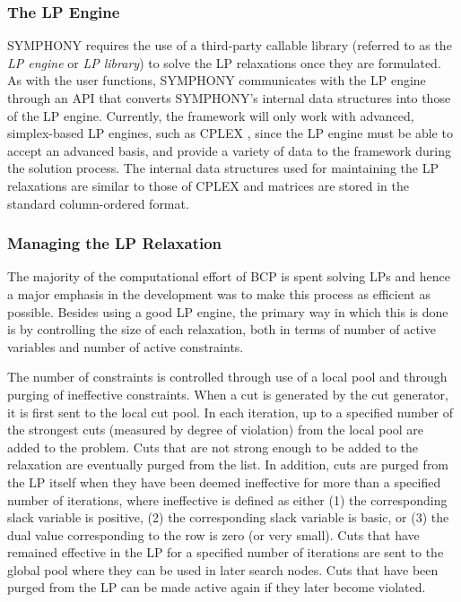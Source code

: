 \subsubsection{The LP Engine}

SYMPHONY requires the use of a third-party callable library (referred
to as the {\em LP engine} or {\em LP library}) to solve the LP
relaxations once they are formulated. As with the user functions,
SYMPHONY communicates with the LP engine through an API that converts
SYMPHONY's internal data structures into those of the LP engine.
Currently, the framework will only work with advanced, simplex-based
LP engines, such as CPLEX \cite{cplex}, since the LP engine must be
able to accept an advanced basis, and provide a variety of data to the
framework during the solution process. The internal data structures
used for maintaining the LP relaxations are similar to those of CPLEX
and matrices are stored in the standard column-ordered format.

\subsubsection{Managing the LP Relaxation}
\label{lp-relaxation}

The majority of the computational effort of BCP is spent
solving LPs and hence a major emphasis in the development was to make
this process as efficient as possible. Besides using a good LP engine,
the primary way in which this is done is by controlling the size of
each relaxation, both in terms of number of active variables and
number of active constraints. 

The number of constraints is controlled through use of a local
pool and through purging of ineffective constraints. When a cut is
generated by the cut generator, it is first sent to the local cut
pool. In each iteration, up to a specified number of the strongest
cuts (measured by degree of violation) from the local pool are added
to the problem. Cuts that are not strong enough to be added to the
relaxation are eventually purged from the list. In addition, cuts are
purged from the LP itself when they have been deemed ineffective for
more than a specified number of iterations, where ineffective is
defined as either (1) the corresponding slack variable is positive,
(2) the corresponding slack variable is basic, or (3) the dual value
corresponding to the row is zero (or very small). Cuts that have
remained effective in the LP for a specified number of iterations are
sent to the global pool where they can be used in later search nodes.
Cuts that have been purged from the LP can be made active again if
they later become violated.

